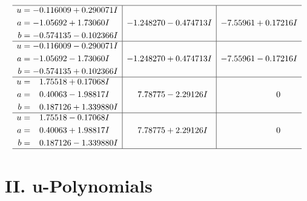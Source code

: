 \documentclass[1p]{elsarticle_modified}
\theoremstyle{definition}
\begin{document}
$$\begin{array}{c|c|c}
 \hline 
\begin{aligned}
u &= -0.116009 + 0.290071 I \\
a &= -1.05692 + 1.73060 I \\
b &= -0.574135 - 0.102366 I\end{aligned}
 & -1.248270 - 0.474713 I & -7.55961 + 0.17216 I \\ \hline\begin{aligned}
u &= -0.116009 - 0.290071 I \\
a &= -1.05692 - 1.73060 I \\
b &= -0.574135 + 0.102366 I\end{aligned}
 & -1.248270 + 0.474713 I & -7.55961 - 0.17216 I \\ \hline\begin{aligned}
u &= \phantom{-}1.75518 + 0.17068 I \\
a &= \phantom{-}0.40063 - 1.98817 I \\
b &= \phantom{-}0.187126 + 1.339880 I\end{aligned}
 & \phantom{-}7.78775 - 2.29126 I & \phantom{-0.000000 } 0 \\ \hline\begin{aligned}
u &= \phantom{-}1.75518 - 0.17068 I \\
a &= \phantom{-}0.40063 + 1.98817 I \\
b &= \phantom{-}0.187126 - 1.339880 I\end{aligned}
 & \phantom{-}7.78775 + 2.29126 I & \phantom{-0.000000 } 0\\
 \hline 
 \end{array}$$\newpage
\newpage\renewcommand{\arraystretch}{1}
\centering \section*{ II. u-Polynomials}
\end{document}
